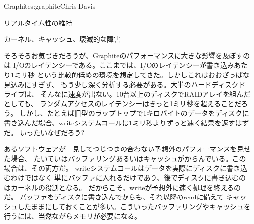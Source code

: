 \begin{aosachapter}{Graphite}{s:graphite}{Chris Davis}
\begin{aosasect1}{リアルタイム性の維持}
\end{aosasect1}

\vspace{-0.1cm} %

\begin{aosasect1}{カーネル、キャッシュ、壊滅的な障害}

\vspace{-0.1cm} %

そろそろお気づきだろうが、Graphiteのパフォーマンスに大きな影響を及ぼすのは
I/Oのレイテンシーである。ここまでは、I/Oのレイテンシーが書き込みあたり1ミリ秒
という比較的低めの環境を想定してきた。しかしこれはおおざっぱな見込みにすぎず、
もう少し深く分析する必要がある。大半のハードディスクドライブは、
そんなに速度が出ない。10台以上のディスクでRAIDアレイを組んだとしても、
ランダムアクセスのレイテンシーはきっと1ミリ秒を超えることだろう。
しかし、たとえば旧型のラップトップで1キロバイトのデータをディスクに
書き込んだ場合、writeシステムコールは1ミリ秒よりずっと速く結果を返すはずだ。
いったいなぜだろう?

あるソフトウェアが一見してつじつまの合わない予想外のパフォーマンスを見せた場合、
たいていはバッファリングあるいはキャッシュがからんでいる。この場合は、その両方だ。
writeシステムコールはデータを実際にディスクに書き込むわけではなく
単にバッファに入れるだけであり、後でディスクに書き込むのはカーネルの役割となる。
だからこそ、writeが予想外に速く処理を終えるのだ。
バッファをディスクに書き込んでからも、それ以降のreadに備えて
キャッシュしたままにしておくことが多い。こういったバッファリングやキャッシュを
行うには、当然ながらメモリが必要になる。


\end{aosasect1}
\end{aosachapter}
